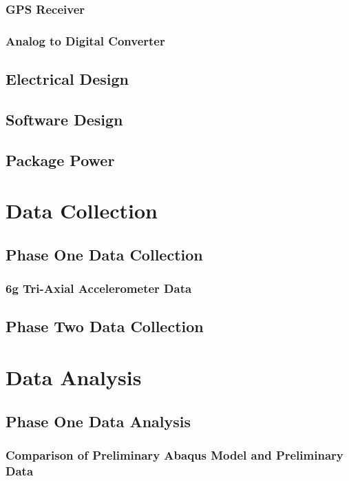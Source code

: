 \documentclass[12pt]{report}
\begin{document}
		\subsection{GPS Receiver}
			
		\subsection{Analog to Digital Converter}
			
	\section{Electrical Design}
			
	\section{Software Design}
		
	\section{Package Power}
		
		
		
\chapter{Data Collection}
\label{ch:DataCollection}
	\section{Phase One Data Collection}
		\subsection{6g Tri-Axial Accelerometer Data}
			
	\section{Phase Two Data Collection}
			
			
			
			
			
		
\chapter{Data Analysis}
\label{ch:DataAnalysis}
	\section{Phase One Data Analysis}
		\subsection{Comparison of Preliminary Abaqus Model and Preliminary Data}
			
\end{document}
